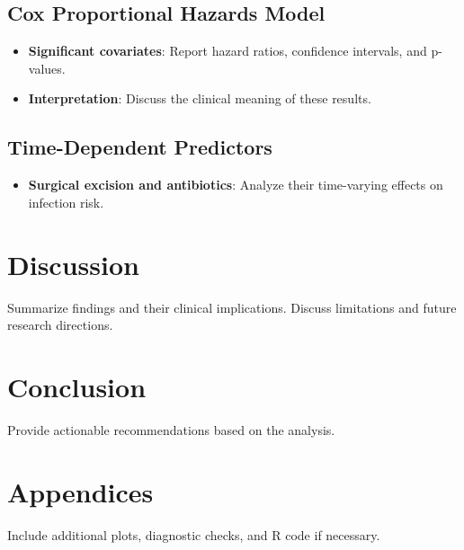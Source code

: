 \documentclass[12pt]{article}
\providecommand{\tightlist}{%
  \setlength{\itemsep}{0pt}\setlength{\parskip}{0pt}}
\begin{document}
\subsection{Cox Proportional Hazards
Model}\label{cox-proportional-hazards-model-1}

\begin{itemize}
\tightlist
\item
  \textbf{Significant covariates}: Report hazard ratios, confidence
  intervals, and p-values.
\item
  \textbf{Interpretation}: Discuss the clinical meaning of these
  results.
\end{itemize}

\subsection{Time-Dependent Predictors}\label{time-dependent-predictors}

\begin{itemize}
\tightlist
\item
  \textbf{Surgical excision and antibiotics}: Analyze their time-varying
  effects on infection risk.
\end{itemize}

\section{Discussion}\label{discussion}

Summarize findings and their clinical implications. Discuss limitations
and future research directions.

\section{Conclusion}\label{conclusion}

Provide actionable recommendations based on the analysis.

\section{Appendices}\label{appendices}

Include additional plots, diagnostic checks, and R code if necessary.



\end{document}
